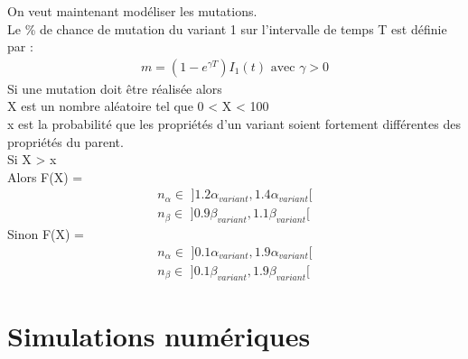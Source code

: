 \documentclass{article}
\begin{document}
\noindent
On veut maintenant modéliser les mutations.\\
Le \% de chance de mutation du variant 1 sur l'intervalle de temps T est définie par :
\begin{align}
    m = (1-e^{\gamma T})I_1(t) \text{ avec }\gamma > \text{0}
\end{align}
\noindent
Si une mutation doit être réalisée alors \\
\noindent
X est un nombre aléatoire tel que 0 < X < 100 \\
x est la probabilité que les propriétés d'un variant soient fortement différentes des propriétés du parent.\\
Si X > x \\
Alors F(X) =
\begin{align}
    n_\alpha \in \text{ ]}1.2\alpha_{variant}, 1.4\alpha_{variant}\text{[}  \\
    n_\beta \in \text{ ]}0.9\beta_{variant}, 1.1\beta_{variant}\text{[}
\end{align}
\noindent
Sinon F(X) = \\
\begin{align}
    n_\alpha \in \text{ ]}0.1\alpha_{variant}, 1.9\alpha_{variant}\text{[} \\
    n_\beta \in \text{ ]}0.1\beta_{variant}, 1.9\beta_{variant}\text{[}
\end{align}


\section{Simulations numériques}
\end{document}
